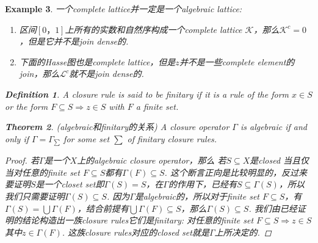 \documentclass{article}
\newtheorem{theorem}{Theorem}[section]
\newtheorem{example}[theorem]{Example}
\newtheorem{definition}[theorem]{Definition}
\newcommand\lattice{\mathcal{L}}
\begin{document}
\begin{example}
\rm 一个complete lattice并一定是一个algebraic lattice:
\begin{enumerate}
	\item 区间$[0，1]$上所有的实数和自然序构成一个complete lattice $\mathcal{K}$，那么$\mathcal{K}^c = {0}$，但是它并不是join dense的. 
	\item 下面的Hasse图也是complete lattice，但是$z$并不是一些complete element的join，那么$\lattice ^c$就不是join dense的.
	\begin{center}
	\end{center}
\end{enumerate}

\begin{definition}
\rm A closure rule is said to be {\color{red} finitary} if it is a rule of the form $x \in S$ or the form $F \subseteq S \Rightarrow  z \in S$ with $F$ a finite set.
\end{definition}

\begin{theorem}
\rm {\color{red} (algebraic和finitary的关系)} A closure operator $\Gamma$ is algebraic if and only if $\Gamma = \Gamma_{\sum}$ for some set $\sum$ of finitary closure rules.
\end{theorem}

\begin{proof}
若$\Gamma$是一个$X$上的algebraic closure operator，那么{\color{red} 若$S \subseteq X$是closed 当且仅当对任意的finite set $F \subseteq S$都有$\Gamma(F) \subseteq S$}. 这个断言正向是比较明显的，反过来要证明$S$是一个closet set即$\Gamma(S) = S$，在$\Gamma$的作用下，已经有$S \subseteq \Gamma(S)$，所以我们只需要证明$\Gamma(S) \subseteq S$. 因为$\Gamma$是algebraic的，所以对于finite set $F \subseteq S$，有$\Gamma(S) = \bigcup \Gamma(F)$，结合前提有$\bigcup \Gamma(F) \subseteq S$，那么$\Gamma(S) \subseteq S$. 我们由已经证明的结论构造出一族closure rules它们是finitary: 对任意的finite set $F \subseteq S \Rightarrow z \in S$其中$z \in \Gamma(F)$. 这族closure rules对应的closed set就是$\Gamma$上所决定的. 


\end{proof}
\end{example}
\end{document}
